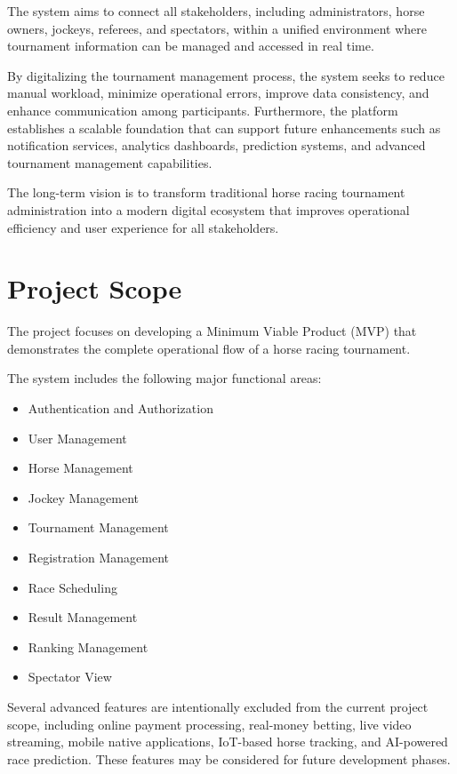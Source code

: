 The system aims to connect all stakeholders, including administrators, horse owners, jockeys, referees, and spectators, within a unified environment where tournament information can be managed and accessed in real time.

By digitalizing the tournament management process, the system seeks to reduce manual workload, minimize operational errors, improve data consistency, and enhance communication among participants. Furthermore, the platform establishes a scalable foundation that can support future enhancements such as notification services, analytics dashboards, prediction systems, and advanced tournament management capabilities.

The long-term vision is to transform traditional horse racing tournament administration into a modern digital ecosystem that improves operational efficiency and user experience for all stakeholders.

\section{Project Scope}

The project focuses on developing a Minimum Viable Product (MVP) that demonstrates the complete operational flow of a horse racing tournament.

The system includes the following major functional areas:

\begin{itemize}
	\item Authentication and Authorization
	\item User Management
	\item Horse Management
	\item Jockey Management
	\item Tournament Management
	\item Registration Management
	\item Race Scheduling
	\item Result Management
	\item Ranking Management
	\item Spectator View
\end{itemize}

Several advanced features are intentionally excluded from the current project scope, including online payment processing, real-money betting, live video streaming, mobile native applications, IoT-based horse tracking, and AI-powered race prediction. These features may be considered for future development phases.

